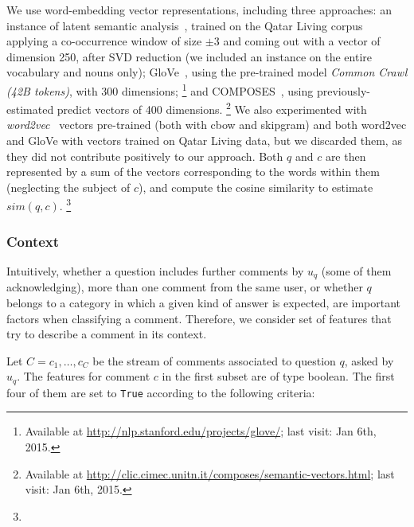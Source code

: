 We use word-embedding vector representations, including three approaches:
\Ni an instance of latent semantic analysis~\cite{croce-previtali:2010:GEMS}, 
trained on the Qatar Living corpus applying a co-occurrence window of size 
$\pm3$ and coming out with a vector of dimension 250, after SVD reduction (we 
included an instance on the entire vocabulary and nouns only);
\Nii GloVe~\cite{Pennington:2014}, using the pre-trained model \textit{Common 
Crawl (42B tokens)}, with 300 dimensions;%
\footnote{Available at \url{http://nlp.stanford.edu/projects/glove/}; last 
visit: Jan 6th, 2015.}
and \Niii COMPOSES~\cite{Baroni:2014}, using previously-estimated predict 
vectors of 400 dimensions.%
\footnote{Available at 
\url{http://clic.cimec.unitn.it/composes/semantic-vectors.html}; last visit: Jan 
6th, 2015.}
We also experimented with \textit{word2vec}~\cite{Mikolov:2013} 
vectors pre-trained (both with cbow and skipgram) and both word2vec and GloVe 
with vectors trained on Qatar Living data, but we discarded them, as they did 
not contribute positively to our approach.
Both $q$ and $c$ are then represented by a sum of the vectors 
corresponding to the words within them (neglecting the subject of $c$), and 
compute the cosine similarity to estimate $sim(q,c)$. 
\footnote{}


\subsubsection{Context }
\label{ssub:context}

Intuitively, whether a question includes further comments by $u_q$ (some of 
them acknowledging), more than one comment from the same user, or whether $q$ 
belongs to a category in which a given kind of answer is expected, are important 
factors when classifying a comment. Therefore, we consider set of features that 
try to describe a comment in its context.   

Let $C={c_1, \ldots,c_C}$ be the stream of comments associated to question $q$, 
asked by $u_q$. The features for comment $c$ in the first subset are of type 
boolean. The first four of them are set to \texttt{True} according to the 
following criteria:

